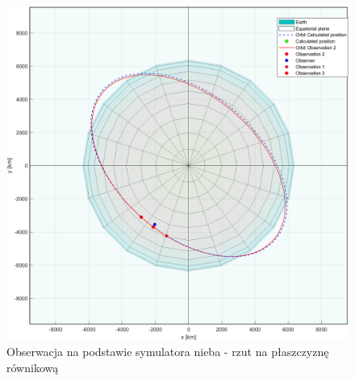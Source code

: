     \begin{figure}[h]
    \centering
    \includegraphics[width=\textwidth]{tex/img/StellariumFigure_rownikowa.png}
    \caption{Obserwacja na podstawie symulatora nieba - rzut na płaszczyznę równikową}
    \label{fig:Stellarium-2}
    \end{figure}
\FloatBarrier